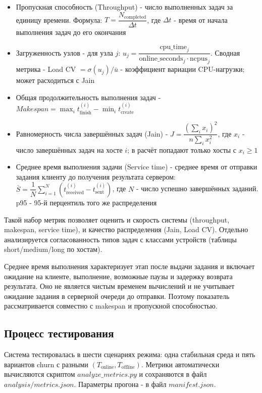 \documentclass[a4paper,12pt]{extarticle}
\begin{document}
\begin{itemize}
    \item Пропускная способность (Throughput) - число выполненных задач за единицу времени. Формула: $T = \dfrac{N_{\text{completed}}}{\Delta t}$, где $\Delta t$ - время от начала выполнения задач до его окончания
    \item Загруженность узлов - для узла $j$: $u_j = \dfrac{\text{cpu\_time}_j}{\text{online\_seconds}_j \cdot \text{ncpus}_j}$. Сводная метрика - Load CV $= \sigma(u_j)/\bar{u}$ - коэффициент вариации CPU-нагрузки; может расходиться с Jain
    \item Общая продолжительность выполнения задач - $Makespan = \max_i t_{\text{finish}}^{(i)} - \min_i t_{\text{create}}^{(i)}$
    \item Равномерность числа завершённых задач (Jain) - $J = \dfrac{(\sum_i x_i)^2}{n\sum_i x_i^2}$, где $x_i$ - число завершённых задач на хосте $i$; в расчёт попадают только хосты с $x_i \geq 1$
    \item Среднее время выполнения задачи (Service time) - среднее время от отправки задания клиенту до получения результата сервером: $\bar{S}=\dfrac{1}{N}\sum_{i=1}^{N}(t_{\text{received}}^{(i)}-t_{\text{sent}}^{(i)})$, где $N$ - число успешно завершённых заданий. p95 - 95-й перцентиль того же распределения
\end{itemize}

Такой набор метрик позволяет оценить и скорость системы (throughput, makespan, service time), и качество распределения (Jain, Load CV). Отдельно анализируется согласованность типов задач с классами устройств (таблицы short/medium/long по хостам).

Среднее время выполнения характеризует этап после выдачи задания и включает ожидание на клиенте, выполнение, возможные паузы и задержку возврата результата. Оно не является чистым временем вычислений и не учитывает ожидание задания в серверной очереди до отправки. Поэтому показатель рассматривается совместно с makespan и пропускной способностью.

\subsection{Процесс тестирования}

Система тестировалась в шести сценариях режима: одна стабильная среда и пять вариантов churn с разными $(T_{\text{online}}, T_{\text{offline}})$. Метрики автоматически вычисляются скриптом $analyze\_metrics.py$ и сохраняются в файл $analysis/metrics.json$. Параметры прогона - в файл $manifest.json$.
\end{document}
